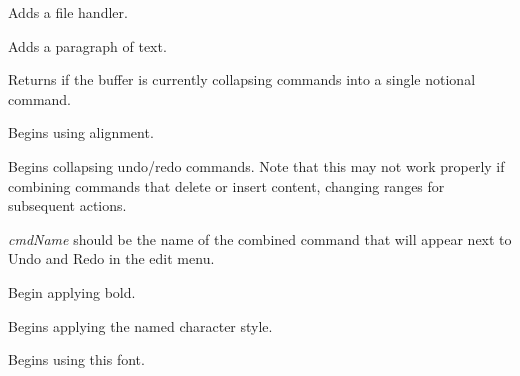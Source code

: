 
Adds a file handler.

\label{wxrichtextbufferaddparagraph}


Adds a paragraph of text.

\label{wxrichtextbufferbatchingundo}


Returns \true if the buffer is currently collapsing commands into a single notional command.

\label{wxrichtextbufferbeginalignment}


Begins using alignment.

\label{wxrichtextbufferbeginbatchundo}


Begins collapsing undo/redo commands. Note that this may not work properly
if combining commands that delete or insert content, changing ranges for
subsequent actions.

{\it cmdName} should be the name of the combined command that will appear
next to Undo and Redo in the edit menu.

\label{wxrichtextbufferbeginbold}


Begin applying bold.

\label{wxrichtextbufferbegincharacterstyle}


Begins applying the named character style.

\label{wxrichtextbufferbeginfont}


Begins using this font.

\label{wxrichtextbufferbeginfontsize}

